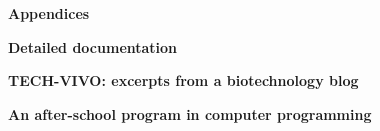 \documentclass{report}
\begin{document}
\begin{outline}
\begin{outline}
  \end{outline}
  \item {\bf Appendices}
  \begin{outline}
    \item {\bf Detailed documentation } \\
    \item {\bf TECH-VIVO: excerpts from a biotechnology blog } \\
    \item {\bf An after-school program in computer programming } \\
    
  \end{outline}
\end{outline}
\end{document}
